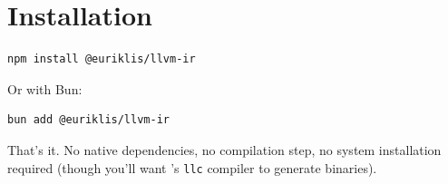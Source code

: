 \section{Installation}

\begin{lstlisting}[style=ts]
npm install @euriklis/llvm-ir
\end{lstlisting}

Or with Bun:
\begin{lstlisting}[style=ts]
bun add @euriklis/llvm-ir
\end{lstlisting}

That's it. No native dependencies, no compilation step, no system  installation required (though you'll want 's \texttt{llc} compiler to generate binaries).

